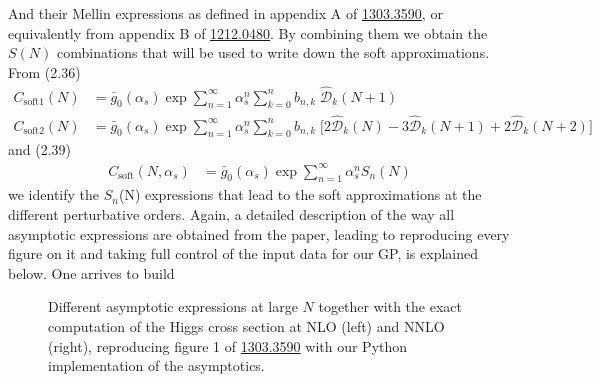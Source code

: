 \documentclass[12pt]{article}
\begin{document}
And their Mellin expressions as defined in appendix A of \href{https://arxiv.org/abs/1303.3590}{1303.3590}, or equivalently from appendix B of \href{https://arxiv.org/pdf/1212.0480.pdf}{1212.0480}. By combining them we obtain the $S(N)$ combinations that will be used to write down the soft approximations. From (2.36)
\begin{align}
	C_{\textrm{soft1}}(N) &= \bar{g}_{0}(\alpha_{s}) \exp \sum_{n = 1}^{\infty} \alpha_{s}^{n} \sum_{k = 0}^{n} b_{n, k} \; \hat{\mathcal{D}}_{k}(N + 1) \\
	C_{\textrm{soft2}}(N) &= \bar{g}_{0}(\alpha_{s}) \exp \sum_{n = 1}^{\infty} \alpha_{s}^{n} \sum_{k = 0}^{n} b_{n, k} \; \bigg[ 2\hat{\mathcal{D}}_{k}(N) - 3\hat{\mathcal{D}}_{k}(N + 1) + 2\hat{\mathcal{D}}_{k}(N + 2) \bigg]
\end{align}
and (2.39) 
\begin{align}
	C_{\textrm{soft}}(N, \alpha_{s}) &= \bar{g}_{0}(\alpha_{s}) \exp \sum_{n = 1}^{\infty} \alpha_{s}^{n} S_{n}(N)
\end{align}
we identify the $S_{n}$(N) expressions that lead to the soft approximations at the different perturbative orders. Again, a detailed description of the way all asymptotic expressions are obtained from the paper, leading to reproducing every figure on it and taking full control of the input data for our GP, is explained below. One arrives to build 

\begin{figure}
	\centering
	\qquad
	\caption{Different asymptotic expressions at large $N$ together with the exact computation of the Higgs cross section at NLO (left) and NNLO (right), reproducing figure 1 of \href{https://arxiv.org/abs/1303.3590}{1303.3590} with our Python implementation of the asymptotics.}
	\label{large_n_asymptotics}
\end{figure}
\end{document}
